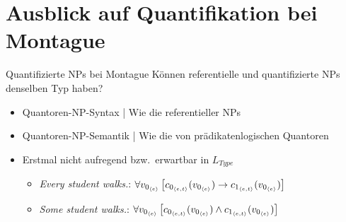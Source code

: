\section{Ausblick auf Quantifikation bei Montague}

\begin{frame}
  {Quantifizierte NPs bei Montague}
  \onslide<+->
  \onslide<+->
  Können referentielle und quantifizierte NPs denselben Typ haben?\\
  \Halbzeile
  \begin{itemize}[<+->]
    \item Quantoren-NP-Syntax | Wie die referentieller NPs
    \item Quantoren-NP-Semantik | Wie die von prädikatenlogischen Quantoren
      \Halbzeile
    \item Erstmal nicht aufregend bzw.\ erwartbar in $L_{Type}$
      \Viertelzeile
      \begin{itemize}[<+->]
        \item \textit{Every student walks.}: \alert{$\forall{v_{0_{{\langle{}e\rangle}}}}\left[{}c_{0_{{\langle{}e,t\rangle}}}(v_{0_{{\langle{}e\rangle}}})\rightarrow{}c_{1_{{\langle{}e,t\rangle}}}(v_{0_{{\langle{}e\rangle}}})\right]$}
        \item \textit{Some student walks.}: \alert{$\forall{v_{0_{{\langle{}e\rangle}}}}\left[{}c_{0_{{\langle{}e,t\rangle}}}(v_{0_{{\langle{}e\rangle}}})\wedge{}c_{1_{{\langle{}e,t\rangle}}}(v_{0_{{\langle{}e\rangle}}})\right]$}
      \end{itemize}
  \end{itemize}
\end{frame}

